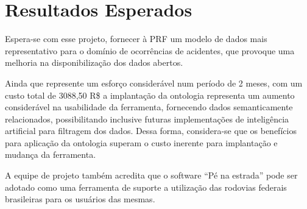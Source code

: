 \section{Resultados Esperados}

  Espera-se com esse projeto, fornecer à PRF um modelo de dados mais representativo
  para o domínio de ocorrências de acidentes, que provoque uma melhoria na
  disponibilização dos dados abertos.

  Ainda que represente um esforço considerável num período de 2 meses, com um custo total de 3088,50 R\$ a implantação da ontologia representa um aumento considerável na usabilidade da ferramenta, fornecendo dados semanticamente relacionados, possibilitando inclusive futuras implementações de inteligência artificial para filtragem dos dados. Dessa forma, considera-se que os benefícios para aplicação da ontologia superam o custo inerente para implantação e mudança da ferramenta. 

  A equipe de projeto também acredita que o software “Pé na estrada” pode ser adotado como uma ferramenta de suporte a utilização das rodovias federais brasileiras para os usuários das mesmas.